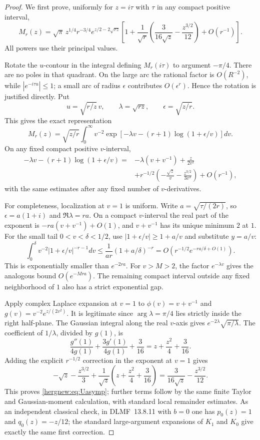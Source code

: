 \begin{proof}
We first prove, uniformly for $z=i\tau$ with $\tau$ in any compact
positive interval,
\begin{equation}\label{hergnew:eq:Uasymp}
 M_r(z)=\sqrt\pi\,z^{1/4}r^{-3/4}
 e^{z/2-2\sqrt{rz}}
 \left[1+\frac1{\sqrt r}
       \left(\frac3{16\sqrt z}-\frac{z^{3/2}}{12}\right)
       +O(r^{-1})\right].
\end{equation}
All powers use their principal values.

Rotate the $u$-contour in the integral defining $M_r(i\tau)$ to
argument $-\pi/4$. There are no poles in that quadrant. On the large
arc the rational factor is $O(R^{-2})$, while
$|e^{-i\tau u}|\le1$; a small arc of radius $\epsilon$ contributes
$O(\epsilon^r)$.
Hence the rotation is justified directly. Put
\[
 u=\sqrt{r/z}\,v,\qquad
 \lambda=\sqrt{rz},\qquad \epsilon=\sqrt{z/r}.
\]
This gives the exact representation
\[
 M_r(z)=\sqrt{z/r}\int_0^\infty v^{-2}
  \exp\left[-\lambda v-(r+1)\log(1+\epsilon/v)\right]dv.
\]
On any fixed compact positive $v$-interval,
\begin{align*}
 -\lambda v-(r+1)\log(1+\epsilon/v)
 ={}&-\lambda(v+v^{-1})+\frac{z}{2v^2}\\
 &+r^{-1/2}\left(-\frac{\sqrt z}{v}
                    -\frac{z^{3/2}}{3v^3}\right)+O(r^{-1}),
\end{align*}
with the same estimates after any fixed number of $v$-derivatives.

For completeness, localization at $v=1$ is uniform. Write
$a=\sqrt{\tau/(2r)}$, so $\epsilon=a(1+i)$ and
$\Re\lambda=ra$. On a compact $v$-interval the real part of the
exponent is $-ra(v+v^{-1})+O(1)$, and $v+v^{-1}$ has its unique
minimum $2$ at $1$. For the small tail $0<v<\delta<1/2$, use
$|1+\epsilon/v|\ge1+a/v$ and substitute $y=a/v$:
\[
 \int_0^\delta v^{-2}|1+\epsilon/v|^{-r-1}dv
 \le\frac1{ar}(1+a/\delta)^{-r}
 =O\left(r^{-1/2}e^{-ra/\delta+O(1)}\right).
\]
This is exponentially smaller than $e^{-2ra}$.
For $v>M>2$, the factor $e^{-\lambda v}$ gives the analogous
bound $O(e^{-Mra})$. The remaining compact interval outside any
fixed neighborhood of $1$ also has a strict exponential gap.

Apply complex Laplace expansion at $v=1$ to
$\phi(v)=v+v^{-1}$ and
$g(v)=v^{-2}e^{z/(2v^2)}$.
It is legitimate since $\arg\lambda=\pi/4$ lies strictly inside
the right half-plane. The Gaussian integral along the real $v$-axis
gives $e^{-2\lambda}\sqrt{\pi/\lambda}$.
The coefficient of $1/\lambda$, divided by $g(1)$, is
\[
 \frac{g''(1)}{4g(1)}+\frac{3g'(1)}{4g(1)}+\frac3{16}
 =z+\frac{z^2}4+\frac3{16}.
\]
Adding the explicit $r^{-1/2}$ correction in the exponent at $v=1$
gives
\[
 -\sqrt z-\frac{z^{3/2}}3
 +\frac1{\sqrt z}\left(z+\frac{z^2}4+\frac3{16}\right)
 =\frac3{16\sqrt z}-\frac{z^{3/2}}{12}.
\]
This proves \eqref{hergnew:eq:Uasymp}; further terms follow by the same
finite Taylor and Gaussian-moment calculation, with standard local
remainder estimates. As an independent classical check, in DLMF~13.8.11
with $b=0$ one has $p_0(z)=1$ and $q_0(z)=-z/12$; the standard large-argument
expansions of $K_1$ and $K_0$ give exactly the same first correction.


\end{proof}
